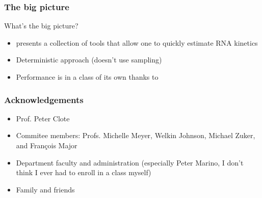\documentclass{beamer}
\begin{document}
\begin{frame}
  \frametitle{The big picture}

  \begin{block}
    {What's the big picture?}
    \begin{itemize}
    \item<1-> \hermes presents a collection of tools that allow one to quickly estimate RNA kinetics
    \item<2-> Deterministic approach (doesn't use sampling)
    \item<3-> Performance is in a class of its own thanks to \ffttwo
    \end{itemize}
  \end{block}
\end{frame}

\begin{frame}
  \frametitle{Acknowledgements}

  \begin{itemize}
  \item Prof. Peter Clote
  \item Commitee members: Profs. Michelle Meyer, Welkin Johnson, Michael Zuker, and Fran{\c c}ois Major
  \item Department faculty and administration (especially Peter Marino, I don't think I ever had to enroll in a class myself)
  \item Family and friends
  \end{itemize}
\end{frame}

\end{document}
